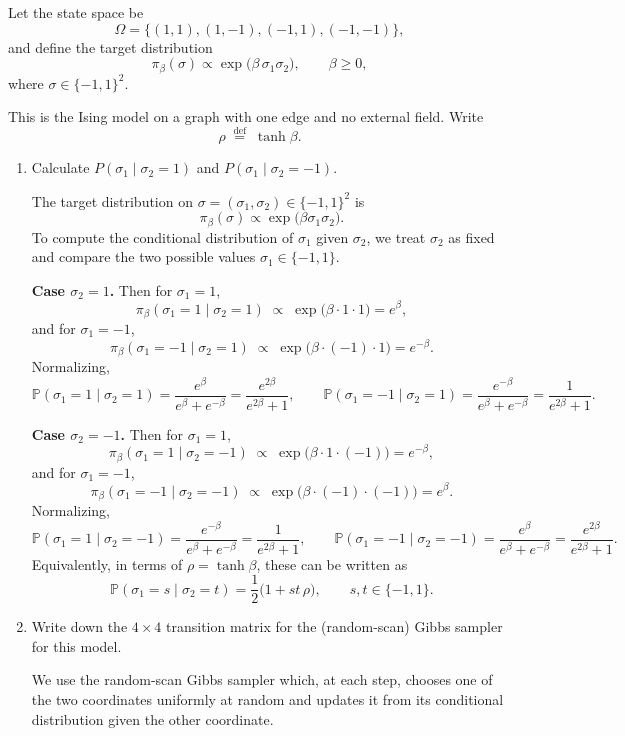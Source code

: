 \documentclass[answers,12pt,addpoints]{exam}
\begin{document}
Let the state space be
\[
\Omega = \{(1,1), (1,-1), (-1,1), (-1,-1)\},
\]
and define the target distribution
\[
\pi_\beta(\sigma) \propto \exp\bigl( \beta\, \sigma_1 \sigma_2 \bigr), \qquad \beta \ge 0,
\]
where $\sigma \in \{-1,1\}^2$.

This is the Ising model on a graph with one edge and no external field. Write
\[
\rho \;\stackrel{\text{def}}{=}\; \tanh \beta.
\]

\begin{enumerate}
\item Calculate $P(\sigma_1 \mid \sigma_2 = 1)$ and $P(\sigma_1 \mid \sigma_2 = -1)$.
\begin{solution}
The target distribution on $\sigma = (\sigma_1,\sigma_2) \in \{-1,1\}^2$ is
\[
\pi_\beta(\sigma) \propto \exp\bigl(\beta \sigma_1 \sigma_2\bigr).
\]
To compute the conditional distribution of $\sigma_1$ given $\sigma_2$, we
treat $\sigma_2$ as fixed and compare the two possible values
$\sigma_1 \in \{-1,1\}$.

\medskip
\noindent\textbf{Case $\sigma_2 = 1$.}
Then for $\sigma_1 = 1$,
\[
\pi_\beta(\sigma_1=1 \mid \sigma_2=1)
\;\propto\;
\exp\bigl(\beta \cdot 1 \cdot 1\bigr)
= e^{\beta},
\]
and for $\sigma_1 = -1$,
\[
\pi_\beta(\sigma_1=-1 \mid \sigma_2=1)
\;\propto\;
\exp\bigl(\beta \cdot (-1) \cdot 1\bigr)
= e^{-\beta}.
\]
Normalizing,
\[
\mathbb{P}(\sigma_1 = 1 \mid \sigma_2 = 1)
= \frac{e^{\beta}}{e^{\beta} + e^{-\beta}}
= \frac{e^{2\beta}}{e^{2\beta} + 1},
\qquad
\mathbb{P}(\sigma_1 = -1 \mid \sigma_2 = 1)
= \frac{e^{-\beta}}{e^{\beta} + e^{-\beta}}
= \frac{1}{e^{2\beta} + 1}.
\]

\medskip
\noindent\textbf{Case $\sigma_2 = -1$.}
Then for $\sigma_1 = 1$,
\[
\pi_\beta(\sigma_1=1 \mid \sigma_2=-1)
\;\propto\;
\exp\bigl(\beta \cdot 1 \cdot (-1)\bigr)
= e^{-\beta},
\]
and for $\sigma_1 = -1$,
\[
\pi_\beta(\sigma_1=-1 \mid \sigma_2=-1)
\;\propto\;
\exp\bigl(\beta \cdot (-1) \cdot (-1)\bigr)
= e^{\beta}.
\]
Normalizing,
\[
\mathbb{P}(\sigma_1 = 1 \mid \sigma_2 = -1)
= \frac{e^{-\beta}}{e^{\beta} + e^{-\beta}}
= \frac{1}{e^{2\beta} + 1},
\qquad
\mathbb{P}(\sigma_1 = -1 \mid \sigma_2 = -1)
= \frac{e^{\beta}}{e^{\beta} + e^{-\beta}}
= \frac{e^{2\beta}}{e^{2\beta} + 1}.
\]
Equivalently, in terms of $\rho = \tanh \beta$, these can be written as
\[
\mathbb{P}(\sigma_1 = s \mid \sigma_2 = t)
= \frac{1}{2}\bigl(1 + s t\, \rho\bigr),
\qquad s,t \in \{-1,1\}.
\]
\end{solution}
\item Write down the $4 \times 4$ transition matrix for the (random-scan) Gibbs sampler for this model.
\begin{solution}
We use the random-scan Gibbs sampler which, at each step, chooses one of the
two coordinates uniformly at random and updates it from its conditional
distribution given the other coordinate.


\end{solution}
\end{enumerate}
\end{document}
